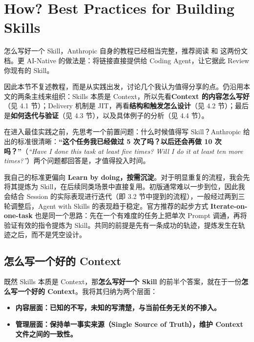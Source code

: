 \section{How? Best Practices for Building Skills}

怎么写好一个 Skill，Anthropic 自身的教程已经相当完整，推荐阅读  和  这两份文档。更 AI-Native 的做法是：将链接直接提供给 Coding Agent，让它据此 Review 你现有的 Skill。

因此本节不复述教程，而是从实践出发，讨论几个我认为值得分享的点。仍沿用本文的两条主线来组织：Skills 本质是 Context，所以先看\textbf{Context 的内容怎么写好}（见 4.1 节）；Delivery 机制是 JIT，再看\textbf{结构和触发怎么设计}（见 4.2 节）；最后是\textbf{如何迭代与验证}（见 4.3 节），以及具体例子的分析（见 4.4 节）。

在进入最佳实践之前，先思考一个前置问题：什么时候值得写 Skill？Anthropic 给出的标准很清晰：\textbf{“这个任务我已经做过 5 次了吗？以后还会再做 10 次吗？”}（\textit{“Have I done this task at least five times? Will I do it at least ten more times?”}）两个问题都回答是，才值得投入时间。

我自己的标准更偏向 \textbf{Learn by doing，按需沉淀}。对于明显重复的流程，我会先将其提炼为 Skill，在后续同类场景中直接复用。初版通常难以一步到位，因此我会结合 Session 的实际表现进行迭代（即 3.2 节中提到的流程），一般经过两到三轮调整后，Agent with Skills 的表现趋于稳定。官方推荐的起步方式 \textbf{Iterate-on-one-task} 也是同一个思路：先在一个有难度的任务上把单次 Prompt 调通，再将验证有效的指令提炼为 Skill。共同的前提是先有一条成功的轨迹，提炼发生在轨迹之后，而不是凭空设计。

\subsection{怎么写一个好的 Context}

既然 Skills 本质是 Context，那\textbf{怎么写好一个 Skill} 的前半个答案，就在于一份\textbf{怎么写一个好的 Context}。我将其归纳为两个层面：

\begin{itemize}
  \item \textbf{内容层面：已知的不写，未知的写清楚，与当前任务无关的不掺入。}
  \item \textbf{管理层面：保持单一事实来源（Single Source of Truth），维护 Context 文件之间的一致性。}
\end{itemize}


